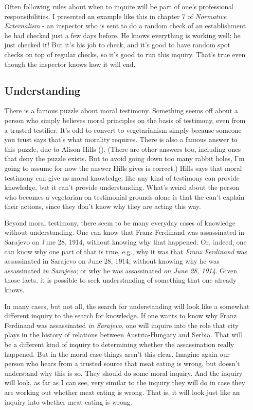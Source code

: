 \documentclass[
  12pt,
  letterpaper,
]{scrbook}
\begin{document}
Often following rules about when to inquire will be part of one's
professional responsibilities. I presented an example like this in
chapter 7 of \emph{Normative Externalism} - an inspector who is sent to
do a random check of an establishment he had checked just a few days
before. He knows everything is working well; he just checked it! But
it's his job to check, and it's good to have random spot checks on top
of regular checks, so it's good to run this inquiry. That's true even
though the inspector knows how it will end.

\subsection{Understanding}\label{sec-understandinginquiry}

There is a famous puzzle about moral testimony. Something seems off
about a person who simply believes moral principles on the basis of
testimony, even from a trusted testifier. It's odd to convert to
vegetarianism simply because someone you trust says that's what morality
requires. There is also a famous answer to this puzzle, due to Alison
Hills (). (There are other answers too,
including ones that deny the puzzle exists. But to avoid going down too
many rabbit holes, I'm going to assume for now the answer Hills gives is
correct.) Hills says that moral testimony can give us moral knowledge,
like any kind of testimony can provide knowledge, but it can't provide
understanding. What's weird about the person who becomes a vegetarian on
testimonial grounds alone is that the can't explain their actions, since
they don't know why they are acting this way.

Beyond moral testimony, there seem to be many everyday cases of
knowledge without understanding. One can know that Franz Ferdinand was
assassinated in Sarajevo on June 28, 1914, without knowing why that
happened. Or, indeed, one can know why one part of that is true, e.g.,
why it was that \emph{Franz Ferdinand} was assassinated in Sarajevo on
June 28, 1914, without knowing why he was assassinated \emph{in
Sarajevo}; or why he was assassinated \emph{on June 28, 1914}. Given
those facts, it is possible to seek understanding of something that one
already knows.

In many cases, but not all, the search for understanding will look like
a somewhat different inquiry to the search for knowledge. If one wants
to know why Franz Ferdinand was assassinated \emph{in Sarajevo}, one
will inquire into the role that city plays in the history of relations
between Austria-Hungary and Serbia. That will be a different kind of
inquiry to determining whether the assassination really happened. But in
the moral case things aren't this clear. Imagine again our person who
hears from a trusted source that meat eating is wrong, but doesn't
understand why this is so. They should do some moral inquiry. And the
inquiry will look, as far as I can see, very similar to the inquiry they
will do in case they are working out whether meat eating is wrong. That
is, it will look just like an inquiry into whether meat eating is wrong.
\end{document}
